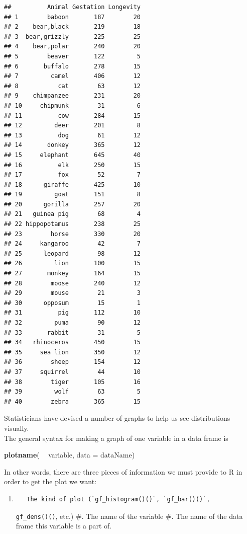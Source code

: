 \documentclass[]{book}
\newenvironment{Shaded}{\begin{snugshade}}{\end{snugshade}}
\newcommand{\DataTypeTok}[1]{\textcolor[rgb]{0.13,0.29,0.53}{#1}}
\newcommand{\KeywordTok}[1]{\textcolor[rgb]{0.13,0.29,0.53}{\textbf{#1}}}
\newcommand{\NormalTok}[1]{#1}
\newcommand{\OperatorTok}[1]{\textcolor[rgb]{0.81,0.36,0.00}{\textbf{#1}}}
\newcommand{\StringTok}[1]{\textcolor[rgb]{0.31,0.60,0.02}{#1}}
\begin{document}
\begin{verbatim}
##          Animal Gestation Longevity
## 1        baboon       187        20
## 2    bear,black       219        18
## 3  bear,grizzly       225        25
## 4    bear,polar       240        20
## 5        beaver       122         5
## 6       buffalo       278        15
## 7         camel       406        12
## 8           cat        63        12
## 9    chimpanzee       231        20
## 10     chipmunk        31         6
## 11          cow       284        15
## 12         deer       201         8
## 13          dog        61        12
## 14       donkey       365        12
## 15     elephant       645        40
## 16          elk       250        15
## 17          fox        52         7
## 18      giraffe       425        10
## 19         goat       151         8
## 20      gorilla       257        20
## 21   guinea pig        68         4
## 22 hippopotamus       238        25
## 23        horse       330        20
## 24     kangaroo        42         7
## 25      leopard        98        12
## 26         lion       100        15
## 27       monkey       164        15
## 28        moose       240        12
## 29        mouse        21         3
## 30      opposum        15         1
## 31          pig       112        10
## 32         puma        90        12
## 33       rabbit        31         5
## 34   rhinoceros       450        15
## 35     sea lion       350        12
## 36        sheep       154        12
## 37     squirrel        44        10
## 38        tiger       105        16
## 39         wolf        63         5
## 40        zebra       365        15
\end{verbatim}

Statisticians have devised a number of graphs to help us see distributions visually.\\
The general syntax for making a graph of one variable in a data frame is

\begin{Shaded}
\begin{Highlighting}[]
\KeywordTok{plotname}\NormalTok{( }\OperatorTok{~}\StringTok{ }\NormalTok{variable, }\DataTypeTok{data =}\NormalTok{ dataName)}
\end{Highlighting}
\end{Shaded}

In other words, there are three pieces of information we must provide to
R in order to get the plot we want:

\begin{enumerate}
\item
\begin{verbatim}
   The kind of plot (`gf_histogram()()`, `gf_bar()()`, 
\end{verbatim}

  \texttt{gf\_dens()()}, etc.)
  \#. The name of the variable
  \#. The name of the data frame this variable is a part of.
\end{enumerate}
\end{document}
